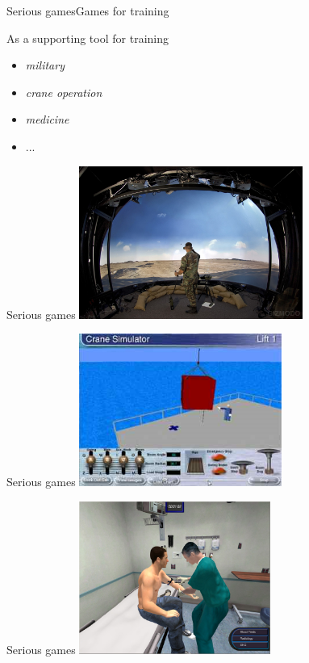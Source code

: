 \documentclass{beamer}
\begin{document}
\begin{slide}{Serious games}{Games for training}{
\item As a supporting tool for training \cite{GAMES_FOR_TRAINING}
\begin{itemize}
\item \textit{military}
\item \textit{crane operation}
\item \textit{medicine}
\item ...
\end{itemize}
}\end{slide}

\begin{frame}{Serious games}
\center
\includegraphics[height=5cm]{Pics/military_simulator.png}
\end{frame}

\begin{frame}{Serious games}
\center
\includegraphics[height=5cm]{Pics/crane_simulator.png}
\end{frame}

\begin{frame}{Serious games}
\center
\includegraphics[height=5cm]{Pics/medical_simulator.png}
\end{frame}
\end{document}
